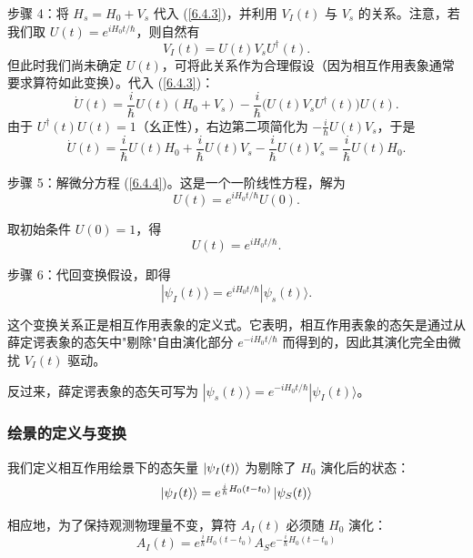 步骤 4：将 \( H_s = H_0 + V_s \) 代入 (\ref{6.4.3})，并利用 \( V_I(t) \) 与 \( V_s \) 的关系。注意，若我们取 \( U(t) = e^{iH_0 t/\hbar} \)，则自然有
\begin{equation}
	V_I(t) = U(t) V_s U^\dagger(t).
\end{equation}
但此时我们尚未确定 \( U(t) \)，可将此关系作为合理假设（因为相互作用表象通常要求算符如此变换）。代入 (\ref{6.4.3})：
\begin{equation}
	\dot{U}(t) = \frac{i}{\hbar} U(t) (H_0 + V_s) - \frac{i}{\hbar} \big( U(t) V_s U^\dagger(t) \big) U(t).
\end{equation}
由于 \( U^\dagger(t) U(t) = 1 \)（幺正性），右边第二项简化为 \( \displaystyle -\frac{i}{\hbar} U(t) V_s \)，于是
\begin{equation}
	\dot{U}(t) = \frac{i}{\hbar} U(t) H_0 + \frac{i}{\hbar} U(t) V_s - \frac{i}{\hbar} U(t) V_s = \frac{i}{\hbar} U(t) H_0. \label{6.4.4}
\end{equation}

步骤 5：解微分方程 (\ref{6.4.4})。这是一个一阶线性方程，解为
\begin{equation}
	U(t) = e^{iH_0 t/\hbar} U(0).
\end{equation}

取初始条件 \( U(0) = 1 \)，得
\begin{equation}
	U(t) = e^{iH_0 t/\hbar}.
\end{equation}

步骤 6：代回变换假设，即得
\begin{equation}
	\boxed{|\psi_I(t)\rangle = e^{iH_0 t/\hbar} |\psi_s(t)\rangle}.
\end{equation}

这个变换关系正是相互作用表象的定义式。它表明，相互作用表象的态矢是通过从薛定谔表象的态矢中"剔除"自由演化部分 \( e^{-iH_0 t/\hbar} \) 而得到的，因此其演化完全由微扰 \( V_I(t) \) 驱动。

反过来，薛定谔表象的态矢可写为 \( |\psi_s(t)\rangle = e^{-iH_0 t/\hbar} |\psi_I(t)\rangle \)。

\subsubsection{绘景的定义与变换}
我们定义相互作用绘景下的态矢量 $\ket{\psi_I(t)}$ 为剔除了 $H_0$ 演化后的状态：
\begin{equation}
	\ket{\psi_I(t)} = e^{\frac{i}{\hbar} H_0 (t-t_0)} \ket{\psi_S(t)} 
\end{equation}

相应地，为了保持观测物理量不变，算符 $A_I(t)$ 必须随 $H_0$ 演化：
\begin{equation}
	A_I(t) = e^{\frac{i}{\hbar} H_0 (t-t_0)} A_S e^{-\frac{i}{\hbar} H_0 (t-t_0)}
\end{equation}

